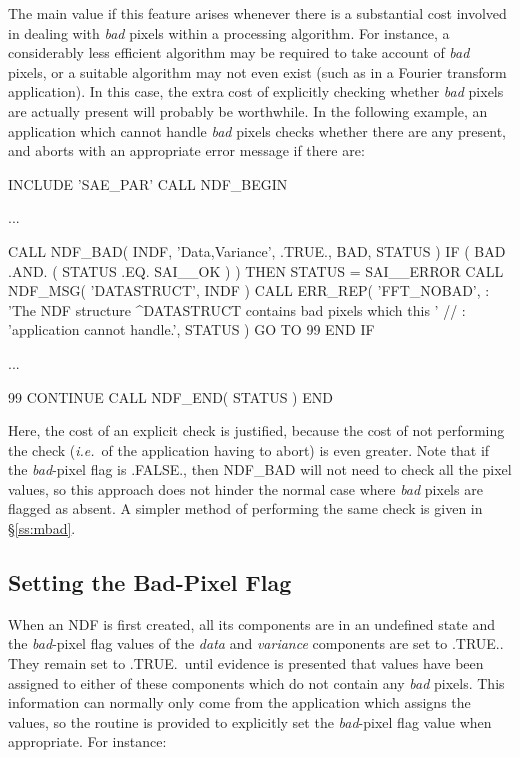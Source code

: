\documentclass[twoside,11pt,nolof]{starlink}
\providecommand{\st}[1]{{\emph{#1}}}
\begin{document}
The main value if this feature arises whenever there is a substantial cost
involved in dealing with \st{bad\/} pixels within a processing algorithm.
For instance, a considerably less efficient algorithm may be required to
take account of \st{bad\/} pixels, or a suitable algorithm may not even exist
(such as in a Fourier transform application).
In this case, the extra cost of explicitly checking whether \st{bad\/} pixels
are actually present will probably be worthwhile.
In the following example, an application which cannot handle \st{bad\/}
pixels checks whether there are any present, and aborts with an appropriate
error message if there are:

\small
\begin{terminalv}
      INCLUDE 'SAE_PAR'
      CALL NDF_BEGIN

      ...

      CALL NDF_BAD( INDF, 'Data,Variance', .TRUE., BAD, STATUS )
      IF ( BAD .AND. ( STATUS .EQ. SAI__OK ) ) THEN
         STATUS = SAI__ERROR
         CALL NDF_MSG( 'DATASTRUCT', INDF )
         CALL ERR_REP( 'FFT_NOBAD',
     :   'The NDF structure ^DATASTRUCT contains bad pixels which this ' //
     :   'application cannot handle.', STATUS )
         GO TO 99
      END IF

      ...

 99   CONTINUE
      CALL NDF_END( STATUS )
      END
\end{terminalv}
\normalsize

Here, the cost of an explicit check is justified, because the cost of not
performing the check (\st{i.e.}\ of the application having to abort) is even
greater.
Note that if the \st{bad\/}-pixel flag is .FALSE., then NDF\_BAD will not
need to check all the pixel values, so this approach does not hinder the
normal case where \st{bad\/} pixels are flagged as absent.
A simpler method of performing the same check is given in \S\ref{ss:mbad}.

\subsection{\label{ss:settingbadpixflag}Setting the Bad-Pixel Flag}

When an NDF is first created, all its components are in an undefined state and
the \st{bad\/}-pixel flag values of the \st{data\/} and \st{variance\/} components
are set to .TRUE..
They remain set to .TRUE.\ until evidence is presented that values have been
assigned to either of these components which do not contain any \st{bad\/}
pixels.
This information can normally only come from the application which assigns the
values, so the routine  is provided to explicitly set the \st{bad\/}-pixel flag value when appropriate.
For instance:
\end{document}
